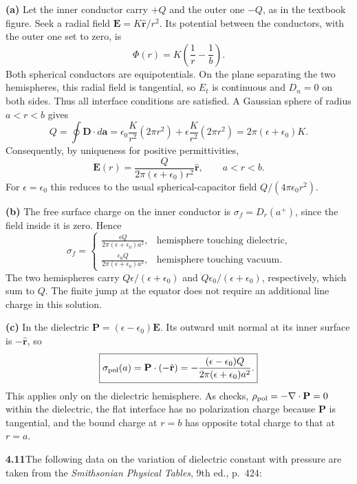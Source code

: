 \textbf{(a)} Let the inner conductor carry $+Q$ and the outer one
$-Q$, as in the textbook figure. Seek a radial field
$\mathbf E=K\hat{\mathbf r}/r^2$. Its potential between the conductors,
with the outer one set to zero, is
\[
\Phi(r)=K\left(\frac1r-\frac1b\right).
\]
Both spherical conductors are equipotentials. On the plane separating
the two hemispheres, this radial field is tangential, so $E_t$ is
continuous and $D_n=0$ on both sides. Thus all interface conditions
are satisfied. A Gaussian sphere of radius $a<r<b$ gives
\[
Q=\oint\mathbf D\cdot d\mathbf a
=\epsilon_0\frac K{r^2}(2\pi r^2)
+\epsilon\frac K{r^2}(2\pi r^2)
=2\pi(\epsilon+\epsilon_0)K.
\]
Consequently, by uniqueness for positive permittivities,
\[
\boxed{\mathbf E(r)=\frac{Q}{2\pi(\epsilon+\epsilon_0)r^2}\hat{\mathbf r},
\qquad a<r<b.}
\]
For $\epsilon=\epsilon_0$ this reduces to the usual spherical-capacitor
field $Q/(4\pi\epsilon_0r^2)$.

\textbf{(b)} The free surface charge on the inner conductor is
$\sigma_f=D_r(a^+)$, since the field inside it is zero. Hence
\[
\boxed{\sigma_f=\begin{cases}
\displaystyle\frac{\epsilon Q}{2\pi(\epsilon+\epsilon_0)a^2},
&\text{hemisphere touching dielectric},\\[5pt]
\displaystyle\frac{\epsilon_0 Q}{2\pi(\epsilon+\epsilon_0)a^2},
&\text{hemisphere touching vacuum}.
\end{cases}}
\]
The two hemispheres carry $Q\epsilon/(\epsilon+\epsilon_0)$ and
$Q\epsilon_0/(\epsilon+\epsilon_0)$, respectively, which sum to $Q$.
The finite jump at the equator does not require an additional line
charge in this solution.

\textbf{(c)} In the dielectric
$\mathbf P=(\epsilon-\epsilon_0)\mathbf E$. Its outward unit normal
at its inner surface is $-\hat{\mathbf r}$, so
\[
\boxed{\sigma_{\rm pol}(a)=\mathbf P\cdot(-\hat{\mathbf r})
=-\frac{(\epsilon-\epsilon_0)Q}
{2\pi(\epsilon+\epsilon_0)a^2}.}
\]
This applies only on the dielectric hemisphere. As checks,
$\rho_{\rm pol}=-\nabla\cdot\mathbf P=0$ within the dielectric,
the flat interface has no polarization charge because $\mathbf P$
is tangential, and the bound charge at $r=b$ has opposite total
charge to that at $r=a$.

\par\bigskip
\noindent\textbf{4.11}\quad The following data on the variation of dielectric constant with pressure are taken from the \emph{Smithsonian Physical Tables}, 9th ed., p.~424:

